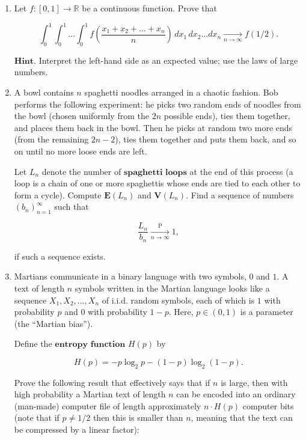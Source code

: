 \documentclass[11pt]{report}
\newcommand{\R}{\mathbb{R}}
\theoremstyle{plain}
\theoremstyle{definition}
\begin{document}
\begin{enumerate}[label=\arabic*.]
\begin{enumerate}[label=(\alph*)]
\item $X\sim N(1,1)$. In this case, identify
$\mathbf{E} X^n$ combinatorially as the number of
$\textbf{involutions}$ (permutations which are
self-inverse) of a set of $n$ elements. To count the
involutions, it is a good idea to divide them into
classes according to how many fixed points they have.
(Note: the expression for $\mathbf{E}(X^n)$ may not
have a very simple form.)
\end{enumerate}

\item Let $f:[0,1]\to\R$ be a continuous function. Prove
that

\[
\int_0^1 \int_0^1 \ldots \int_0^1 f\left(\frac{x_1+x_2+\ldots+x_n}{n}\right)\,dx_1\,dx_2\ldots dx_n \xrightarrow[n\to\infty]{} f(1/2).
\]

$\textbf{Hint.}$ Interpret the left-hand side as an
expected value; use the laws of large numbers.

\item A bowl contains $n$ spaghetti noodles arranged in a
chaotic fashion. Bob performs the following
experiment: he picks two random ends of noodles from
the bowl (chosen uniformly from the $2n$ possible
ends), ties them together, and places them back in the
bowl. Then he picks at random two more ends (from the
remaining $2n-2$), ties them together and puts them
back, and so on until no more loose ends are left.

Let $L_n$ denote the number of
$\textbf{spaghetti loops}$ at the end of this process
(a loop is a chain of one or more spaghettis whose
ends are tied to each other to form a cycle). Compute
$\mathbf{E}(L_n)$ and $\mathbf{V}(L_n)$. Find a
sequence of numbers $(b_n)_{n=1}^\infty$ such that

\[
\frac{L_n}{b_n} \xrightarrow[n\to\infty]{\mathrm{P}} 1,
\]

if such a sequence exists.

\item Martians communicate in a binary language with two
symbols, $0$ and $1$. A text of length $n$ symbols
written in the Martian language looks like a sequence
$X_1, X_2, \ldots, X_n$ of i.i.d. random symbols,
each of which is $1$ with probability $p$ and $0$
with probability $1-p$. Here, $p\in(0,1)$ is a
parameter (the ``Martian bias'').

Define the $\textbf{entropy function}$ $H(p)$ by

\[
H(p) = -p\log_2 p -(1-p)\log_2 (1-p).
\]

Prove the following result that effectively says
that if $n$ is large, then with high probability a
Martian text of length $n$ can be encoded into an
ordinary (man-made) computer file of length
approximately $n\cdot H(p)$ computer bits (note that
if $p\neq 1/2$ then this is smaller than $n$, meaning
that the text can be compressed by a linear factor):


\end{enumerate}
\end{document}
